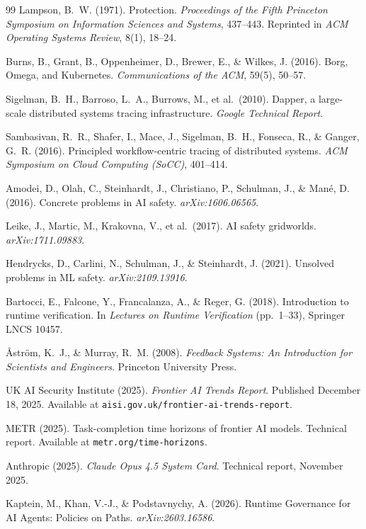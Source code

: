 \documentclass[11pt,a4paper]{article}
\theoremstyle{remark}
\begin{document}
\begin{thebibliography}{99}
Lampson, B.~W. (1971). Protection. \textit{Proceedings of the Fifth Princeton Symposium on Information Sciences and Systems}, 437--443. Reprinted in \textit{ACM Operating Systems Review}, 8(1), 18--24.

Burns, B., Grant, B., Oppenheimer, D., Brewer, E., \& Wilkes, J. (2016). Borg, Omega, and Kubernetes. \textit{Communications of the ACM}, 59(5), 50--57.

Sigelman, B.~H., Barroso, L.~A., Burrows, M., et al.\ (2010). Dapper, a large-scale distributed systems tracing infrastructure. \textit{Google Technical Report}.

Sambasivan, R.~R., Shafer, I., Mace, J., Sigelman, B.~H., Fonseca, R., \& Ganger, G.~R. (2016). Principled workflow-centric tracing of distributed systems. \textit{ACM Symposium on Cloud Computing (SoCC)}, 401--414.

Amodei, D., Olah, C., Steinhardt, J., Christiano, P., Schulman, J., \& Mané, D. (2016). Concrete problems in AI safety. \textit{arXiv:1606.06565}.

Leike, J., Martic, M., Krakovna, V., et al.\ (2017). AI safety gridworlds. \textit{arXiv:1711.09883}.

Hendrycks, D., Carlini, N., Schulman, J., \& Steinhardt, J. (2021). Unsolved problems in ML safety. \textit{arXiv:2109.13916}.

Bartocci, E., Falcone, Y., Francalanza, A., \& Reger, G. (2018). Introduction to runtime verification. In \textit{Lectures on Runtime Verification} (pp.\ 1--33), Springer LNCS 10457.

Åström, K.~J., \& Murray, R.~M. (2008). \textit{Feedback Systems: An Introduction for Scientists and Engineers}. Princeton University Press.

UK AI Security Institute (2025). \textit{Frontier AI Trends Report}. Published December 18, 2025. Available at \texttt{aisi.gov.uk/frontier-ai-trends-report}.

METR (2025). Task-completion time horizons of frontier AI models. Technical report. Available at \texttt{metr.org/time-horizons}.

Anthropic (2025). \textit{Claude Opus 4.5 System Card}. Technical report, November 2025.

Kaptein, M., Khan, V.-J., \& Podstavnychy, A. (2026). Runtime Governance for AI Agents: Policies on Paths. \textit{arXiv:2603.16586}.

\end{thebibliography}
\end{document}
